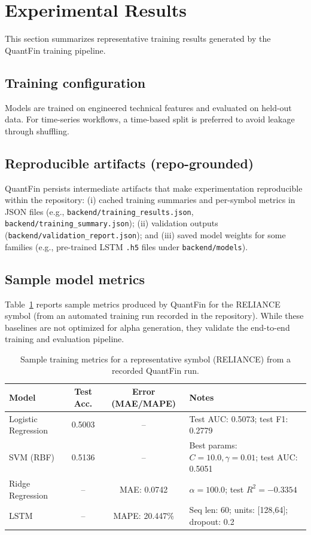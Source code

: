 \documentclass[conference]{IEEEtran}
\begin{document}
\section{Experimental Results}\label{sec:exp}
This section summarizes representative training results generated by the QuantFin training pipeline.

\subsection{Training configuration}
Models are trained on engineered technical features and evaluated on held-out data. For time-series workflows, a time-based split is preferred to avoid leakage through shuffling.

\subsection{Reproducible artifacts (repo-grounded)}
QuantFin persists intermediate artifacts that make experimentation reproducible within the repository: (i) cached training summaries and per-symbol metrics in JSON files (e.g., \texttt{backend/training\_results.json}, \texttt{backend/training\_summary.json}); (ii) validation outputs (\texttt{backend/validation\_report.json}); and (iii) saved model weights for some families (e.g., pre-trained LSTM \texttt{.h5} files under \texttt{backend/models}).

\subsection{Sample model metrics}
Table~\ref{tab:metrics} reports sample metrics produced by QuantFin for the RELIANCE symbol (from an automated training run recorded in the repository). While these baselines are not optimized for alpha generation, they validate the end-to-end training and evaluation pipeline.

\begin{table}[t]
\centering
\caption{Sample training metrics for a representative symbol (RELIANCE) from a recorded QuantFin run.}
\label{tab:metrics}
\small
\renewcommand{\arraystretch}{1.15}
\setlength{\tabcolsep}{6pt}
\begin{tabularx}{\textwidth}{|l|c|c|X|}
\hline
\textbf{Model} & \textbf{Test Acc.} & \textbf{Error (MAE/MAPE)} & \textbf{Notes} \\
\hline
Logistic Regression & 0.5003 & -- & Test AUC: 0.5073; test F1: 0.2779 \\
SVM (RBF) & 0.5136 & -- & Best params: $C=10.0,\gamma=0.01$; test AUC: 0.5051 \\
Ridge Regression & -- & MAE: 0.0742 & $\alpha=100.0$; test $R^2=-0.3354$ \\
LSTM & -- & MAPE: 20.447\% & Seq len: 60; units: [128,64]; dropout: 0.2 \\
\hline
\end{tabularx}
\end{table}
\end{document}
